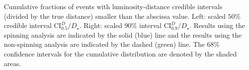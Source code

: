 \label{fig:distance} Cumulative fractions of events with luminosity-distance credible intervals (divided by the true distance) smaller than the abscissa value. Left: scaled $50\%$ credible interval $\mathrm{CI}^{D}_{0.5}/D_\star$. Right: scaled $90\%$ interval $\mathrm{CI}^{D}_{0.9}/D_\star$. Results using the spinning analysis are indicated by the solid (blue) line and the results using the non-spinning analysis \citep{Berry_2014} are indicated by the dashed (green) line. The $68\%$ confidence intervals for the cumulative distribution are denoted by the shaded areas.
  